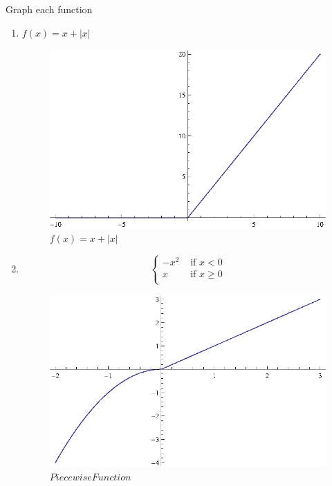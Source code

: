 \documentclass{exam}
\begin{document}
  Graph each function
  \begin{enumerate}

    \item $f(x) = x + |x|$ 
      \ifprintanswers
        \begin{figure}[H]
          \centering
          \includegraphics[scale=0.8]{review1.eps}
          \caption{$f(x) = x + |x|$}
        \end{figure}
      \fi

    \item 
      \[
        \begin{cases}
          -x^2 & \text{ if } x < 0 \\
          x    & \text{ if } x \geq 0 \\
        \end{cases}
      \]

      \ifprintanswers
        \begin{figure}[H]
          \centering
          \includegraphics[scale=0.8]{review2.eps}
          \caption{$Piecewise Function$}
        \end{figure}
      \fi

  \end{enumerate}
\end{document}
